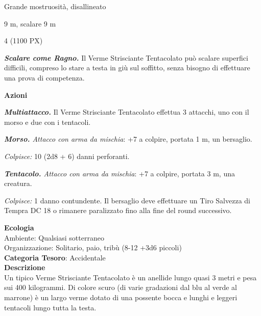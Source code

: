 \begin{multicols}{2}
{
\begin{description}[noitemsep, topsep=0pt, parsep=0pt, partopsep=0pt, itemsep=1pt, leftmargin=2.35cm,  labelwidth=2.2cm, itemindent=0cm, listparindent=0pt] %
\setlength{\baselineskip}{10pt}
\item[\textbf{Taglia/Tipo}] Grande mostruosità, disallineato
\item[\textbf{Caratt.}] 
\item[\textbf{Punti Ferita}] 
\item[\textbf{Movimento}] 9 m, scalare 9 m
\item[\textbf{Tiri Salvez.}] 
\item[\textbf{Sensi}] 
\item[\textbf{Sfida}] 4 (1100 PX)
\end{description}
\smallskip

\emph{\textbf{Scalare come Ragno.}} Il Verme Strisciante Tentacolato può scalare superfici difficili, compreso lo stare a testa in giù sul soffitto, senza bisogno di effettuare una prova di competenza.

\textbf{Azioni}

\emph{\textbf{Multiattacco.}} Il Verme Strisciante Tentacolato effettua 3 attacchi, uno con il morso e due con i tentacoli.

\emph{\textbf{Morso.} Attacco con arma da mischia}: +7 a colpire, portata 1 m, un bersaglio.

\emph{Colpisce:} 10 (2d8 + 6) danni perforanti.

\emph{\textbf{Tentacolo.} Attacco con arma da mischia}: +7 a colpire, portata 3 m, una creatura.

\emph{Colpisce:} 1 danno contundente. Il bersaglio deve effettuare un Tiro Salvezza di Tempra DC 18 o rimanere paralizzato fino alla fine del round successivo.

\textbf{Ecologia}\\
Ambiente: Qualsiasi sotterraneo\\
Organizzazione: Solitario, paio, tribù (8-12 +3d6 piccoli)\\
\textbf{Categoria Tesoro}: Accidentale\\
\textbf{Descrizione}\\
Un tipico Verme Strisciante Tentacolato è un anellide lungo quasi 3 metri e pesa sui 400 kilogrammi. Di colore scuro (di varie gradazioni dal blu al verde al marrone) è un largo verme dotato di una possente bocca e lunghi e leggeri tentacoli lungo tutta la testa.

}
\end{multicols}
